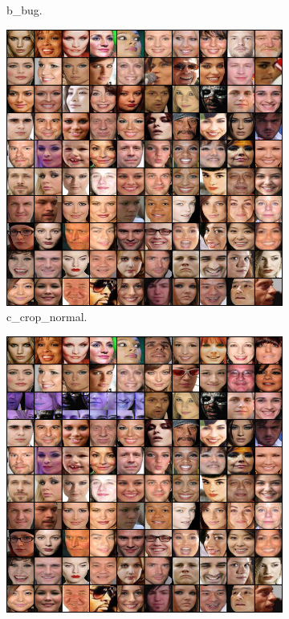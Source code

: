 \begin{figure}[!htbp]
\begin{subfigure}[t]{0.48\textwidth}
   \caption{b_bug.}
   \label{fig:2019-05-06_celeba-bug-b}
\end{subfigure}
\begin{subfigure}[t]{0.48\textwidth}
   \includegraphics[width=\textwidth,center]{2019-05-06/celeba-bug/c_crop_normal.png}
   \caption{c_crop_normal.}
   \label{fig:2019-05-06_celeba-bug-c}
\end{subfigure}
\begin{subfigure}[t]{0.48\textwidth}
   \includegraphics[width=\textwidth,center]{2019-05-06/celeba-bug/d_crop_bug.png}

\end{subfigure}
\end{figure}
